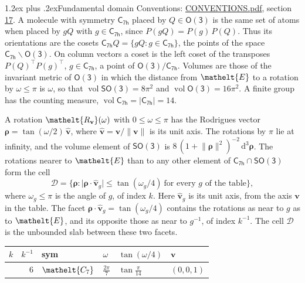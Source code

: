 \documentclass[10pt,a4paper]{article}
\makeatletter
\renewcommand\section{\@startsection{section}{1}{\z@}{-3ex plus -1ex minus -.2ex}%
  {1.2ex plus .2ex}{\normalfont\large\sffamily\bfseries\color{parttitle}}}
\numberwithin{equation}{section}
\newcommand{\eltfont}[1]{{\let\sigma\eltsigma\mathelt{#1}}}
\newcommand{\grp}[1]{\mathsf{#1}}
\newcommand{\cls}[1]{\eltfont{#1}}
\newcommand{\elt}[1]{\eltfont{#1}}
\newcommand{\dirvec}[3]{(#1, #2, #3)}
\newcommand{\unitaxis}{\hat{\mathbf{v}}}
\newcommand{\vv}{\mathbf{v}}
\newcommand{\diff}{\mathrm{d}}
\newcommand{\vol}{\operatorname{vol}}
\newcommand{\rodrigues}{\boldsymbol{\rho}}
\newcommand{\fcell}{\mathcal{D}}
\makeatother
\begin{document}
\section{Fundamental domain}\label{s:fundamental_domain}
Conventions: \href{../../CONVENTIONS.pdf}{CONVENTIONS.pdf}, section \href{../../CONVENTIONS.pdf\#conv.17}{17}.
\leavevmode\label{n:element.placement}A molecule with symmetry $\grp{C_{7h}}$ placed by $Q \in \grp{O(3)}$ is the same set of atoms when placed by $gQ$ with $g \in \grp{C_{7h}}$, since $P(gQ) = P(g)\,P(Q)$. \label{n:operator.cosets}Thus its orientations are the cosets $\grp{C_{7h}}Q = \{gQ : g \in \grp{C_{7h}}\}$, the points of the space $\grp{C_{7h}}\backslash\grp{O(3)}$. On column vectors a coset is the left coset of the transposes $P(Q)^{\top}P(g)^{\top}$, $g \in \grp{C_{7h}}$, a point of $\grp{O(3)}/\grp{C_{7h}}$.
\leavevmode\label{n:operator.volume}Volumes are those of the invariant metric of \href{O3.pdf}{$\grp{O(3)}$} in which the distance from $\elt{E}$ to a rotation by $\omega \le \pi$ is $\omega$, so that $\vol\grp{SO(3)} = 8\pi^2$ and $\vol\grp{O(3)} = 16\pi^2$. A finite group has the counting measure, $\vol\grp{C_{7h}} = |\grp{C_{7h}}| = 14$.

\leavevmode\label{n:vector.rodrigues}\label{n:vector.unitaxis}A rotation $\elt{R_{\vv}}(\omega)$ with $0 \le \omega \le \pi$ has the Rodrigues vector $\rodrigues = \tan(\omega/2)\,\unitaxis$, where $\unitaxis = \vv/\lVert\vv\rVert$ is its unit axis. The rotations by $\pi$ lie at infinity, and the volume element of \href{SO3.pdf}{$\grp{SO(3)}$} is $8\,(1 + \lVert\rodrigues\rVert^2)^{-2}\,\diff^3\rodrigues$.
\leavevmode\label{n:set.cell}The rotations nearer to $\elt{E}$ than to any other element of $\grp{C_{7h}} \cap \grp{SO(3)}$ form the cell
\begin{equation}\label{e:cell}\fcell = \bigl\{\rodrigues : \lvert\rodrigues\cdot\unitaxis_g\rvert \le \tan(\omega_g/4)\ \text{for every $g$ of the table}\bigr\},\end{equation}
where $\omega_g \le \pi$ is the angle of $g$, of index $k$. Here $\unitaxis_g$ is its unit axis, from the axis $\vv$ in the table. The facet $\rodrigues\cdot\unitaxis_g = \tan(\omega_g/4)$ contains the rotations as near to $g$ as to $\elt{E}$, and its opposite those as near to $g^{-1}$, of index $k^{-1}$. The cell $\fcell$ is the unbounded slab between these two facets.
{\small{\renewcommand{\arraystretch}{1.3}\begin{longtable}{@{}rrllll@{}}\toprule
$k$ & $k^{-1}$ & sym & $\omega$ & $\tan(\omega/4)$ & $\vv$\\\midrule\endhead
\bottomrule\endfoot\endlastfoot
1 & 6 & $\cls{C_{7}}$ & $\tfrac{2\pi}{7}$ & $\tan\tfrac{\pi}{14}$ & $\dirvec{0}{0}{1}$\\
\bottomrule\end{longtable}}}
\end{document}
